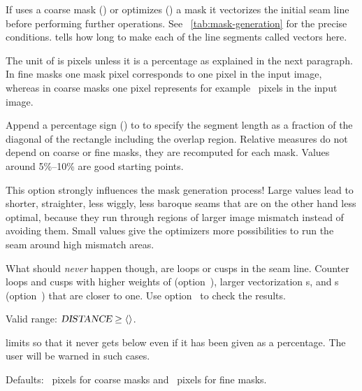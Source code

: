 \begin{codelist}
  If \App{} uses a coarse mask () or
  \App{} optimizes () a mask it vectorizes the
  initial seam line before performing further operations.  See
  \tableName~\ref{tab:mask-generation} for the precise conditions.   tells
  \App{} how long to make each of the line segments called vectors here.

  The unit of  is pixels unless it is a percentage as explained in the next
  paragraph.  In fine masks one mask pixel corresponds to one pixel in the input image, whereas
  in coarse masks one pixel represents for example ~pixels in
  the input image.

  Append a percentage sign (\sample{\%}) to  to specify the segment length as
  a fraction of the diagonal of the rectangle including the overlap region.  Relative measures
  do not depend on coarse or fine masks, they are recomputed for each mask.  Values around
  5\%--10\% are good starting points.

  This option strongly influences the mask generation process!  Large  values
  lead to shorter, straighter, less wiggly, less baroque seams that are on the other hand less
  optimal, because they run through regions of larger image mismatch instead of avoiding them.
  Small  values give the optimizers more possibilities to run the seam around
  high mismatch areas.

  What should \emph{never} happen though, are loops or cusps in the seam line.  Counter loops
  and cusps with higher weights of 
  (option~), larger
  vectorization s, and s
  (option~) that are closer to one.  Use
  option~ to check the results.

  Valid range: $\metavar{DISTANCE} \geq \val{val:minimum-vectorize-distance}$.

  \App{} limits  so that it never gets below
   even if it has been given as a percentage.  The user will
  be warned in such cases.

  Defaults: ~pixels for coarse masks and
  ~pixels for fine masks.



\end{codelist}
